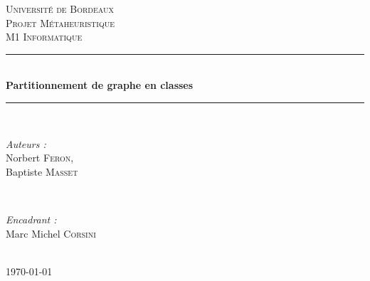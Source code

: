 \documentclass[a4paper]{article}
\begin{document}
\begin{titlepage}
\newcommand{\HRule}{\rule{\linewidth}{0.5mm}} 
\center 
 

\textsc{\LARGE Université de Bordeaux}\\[1.5cm] 
\textsc{\Large Projet Métaheuristique}\\[0.5cm] 
\textsc{\large M1 Informatique}\\[0.5cm] 


\HRule \\[0.4cm]
{ \huge \bfseries Partitionnement de graphe en classes}\\[0.4cm] %
\HRule \\[1.5cm]
 

\begin{minipage}{0.4\textwidth}
\begin{flushleft} \large
\emph{Auteurs : }\\
Norbert \textsc{Feron},\\
Baptiste \textsc{Masset}
\end{flushleft}
\end{minipage}
~
\begin{minipage}{0.4\textwidth}
\begin{flushright} \large
\emph{Encadrant : } \\
Marc Michel \textsc{Corsini} 
\end{flushright}
\end{minipage}\\[2cm]


{\large \today}\\[2cm]


\end{titlepage}
\end{document}
